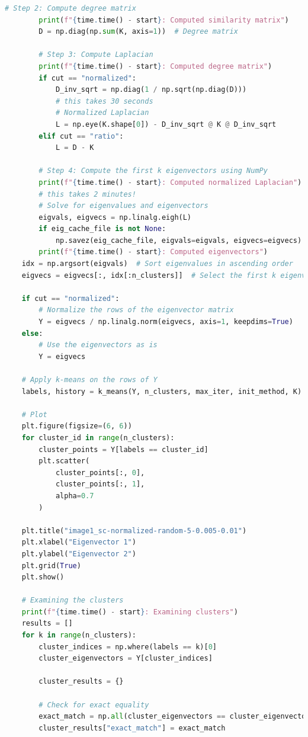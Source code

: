 \documentclass{homework}
\begin{document}
\begin{lstlisting}[language=Python]
        # Step 2: Compute degree matrix
        print(f"{time.time() - start}: Computed similarity matrix")
        D = np.diag(np.sum(K, axis=1))  # Degree matrix

        # Step 3: Compute Laplacian
        print(f"{time.time() - start}: Computed degree matrix")
        if cut == "normalized":
            D_inv_sqrt = np.diag(1 / np.sqrt(np.diag(D)))
            # this takes 30 seconds
            # Normalized Laplacian
            L = np.eye(K.shape[0]) - D_inv_sqrt @ K @ D_inv_sqrt
        elif cut == "ratio":
            L = D - K

        # Step 4: Compute the first k eigenvectors using NumPy
        print(f"{time.time() - start}: Computed normalized Laplacian")
        # this takes 2 minutes!
        # Solve for eigenvalues and eigenvectors
        eigvals, eigvecs = np.linalg.eigh(L)
        if eig_cache_file is not None:
            np.savez(eig_cache_file, eigvals=eigvals, eigvecs=eigvecs)
        print(f"{time.time() - start}: Computed eigenvectors")
    idx = np.argsort(eigvals)  # Sort eigenvalues in ascending order
    eigvecs = eigvecs[:, idx[:n_clusters]]  # Select the first k eigenvectors

    if cut == "normalized":
        # Normalize the rows of the eigenvector matrix
        Y = eigvecs / np.linalg.norm(eigvecs, axis=1, keepdims=True)
    else:
        # Use the eigenvectors as is
        Y = eigvecs

    # Apply k-means on the rows of Y
    labels, history = k_means(Y, n_clusters, max_iter, init_method, K)

    # Plot
    plt.figure(figsize=(6, 6))
    for cluster_id in range(n_clusters):
        cluster_points = Y[labels == cluster_id]
        plt.scatter(
            cluster_points[:, 0],
            cluster_points[:, 1],
            alpha=0.7
        )

    plt.title("image1_sc-normalized-random-5-0.005-0.01")
    plt.xlabel("Eigenvector 1")
    plt.ylabel("Eigenvector 2")
    plt.grid(True)
    plt.show()

    # Examining the clusters
    print(f"{time.time() - start}: Examining clusters")
    results = []
    for k in range(n_clusters):
        cluster_indices = np.where(labels == k)[0]
        cluster_eigenvectors = Y[cluster_indices]

        cluster_results = {}

        # Check for exact equality
        exact_match = np.all(cluster_eigenvectors == cluster_eigenvectors[0])
        cluster_results["exact_match"] = exact_match


\end{lstlisting}
\end{document}
